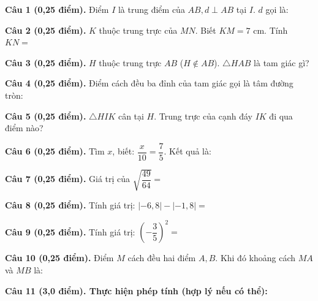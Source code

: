 \documentclass[12pt,a4paper]{article}
\begin{document}
\vspace{1.2mm}
\noindent\textbf{Câu 1 (0,25 điểm).} Điểm $I$ là trung điểm của $AB, d \perp AB$ tại $I$. $d$ gọi là: \par\vspace{2.0mm}
\noindent\textbf{Câu 2 (0,25 điểm).} $K$ thuộc trung trực của $MN$. Biết $KM = 7\text{ cm}$. Tính $KN =$ \par\vspace{2.0mm}
\noindent\textbf{Câu 3 (0,25 điểm).} $H$ thuộc trung trực $AB$ ($H \notin AB$). $\triangle HAB$ là tam giác gì? \par\vspace{2.0mm}
\noindent\textbf{Câu 4 (0,25 điểm).} Điểm cách đều ba đỉnh của tam giác gọi là tâm đường tròn: \par\vspace{2.0mm}
\noindent\textbf{Câu 5 (0,25 điểm).} $\triangle HIK$ cân tại $H$. Trung trực của cạnh đáy $IK$ đi qua điểm nào? \par\vspace{2.0mm}
\noindent\textbf{Câu 6 (0,25 điểm).} Tìm $x$, biết: $\dfrac{x}{10} = \dfrac{7}{5}$. Kết quả là: \par\vspace{2.0mm}
\noindent\textbf{Câu 7 (0,25 điểm).} Giá trị của $\sqrt{\dfrac{49}{64}} =$ \par\vspace{2.0mm}
\noindent\textbf{Câu 8 (0,25 điểm).} Tính giá trị: $|-6{,}8| - |-1{,}8| =$ \par\vspace{2.0mm}
\noindent\textbf{Câu 9 (0,25 điểm).} Tính giá trị: $\left(-\dfrac{3}{5}\right)^2 =$ \par\vspace{2.0mm}
\noindent\textbf{Câu 10 (0,25 điểm).} Điểm $M$ cách đều hai điểm $A, B$. Khi đó khoảng cách $MA$ và $MB$ là: \par\vspace{2.0mm}
\vspace{0.6mm}
\noindent\textbf{Câu 11 (3,0 điểm). Thực hiện phép tính (hợp lý nếu có thể):}
\vspace{0.6mm}
\end{document}
